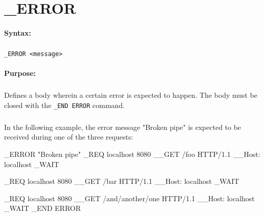 
\newpage
\section{\_ERROR}
\label{cmd:_ERROR}

\paragraph{Syntax:}
\subparagraph{}
\texttt{\_ERROR <message>}

\paragraph{Purpose:}
\subparagraph{}
Defines a body wherein a certain error is expected to happen. 
The body must be closed with the \texttt{\_END ERROR} command.

\subparagraph{}
In the following example, the error message "Broken pipe" is 
expected to be received during one of the three requests: 

\begin{usplisting}
    _ERROR "Broken pipe"
    _REQ localhost 8080
    __GET /foo HTTP/1.1
    __Host: localhost
    _WAIT

    _REQ localhost 8080
    __GET /bar HTTP/1.1
    __Host: localhost
    _WAIT

    _REQ localhost 8080
    __GET /and/another/one HTTP/1.1
    __Host: localhost
    _WAIT
    _END ERROR
\end{usplisting}
